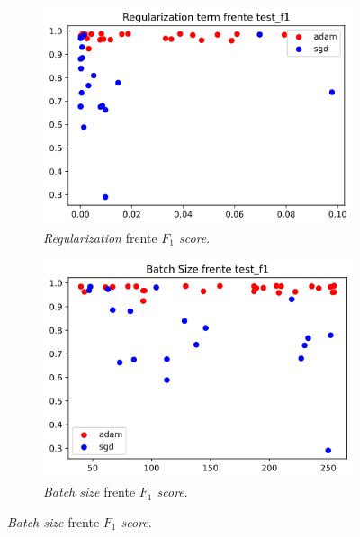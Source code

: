 \begin{figure}[H]
\begin{subfigure}{.5\textwidth}
  \centering
  \includegraphics[width=.8\linewidth]{imagenes/06_Experimentacion/caeimages/caereg.png}
  \caption{\textit{Regularization} frente \textit{$F_1$ score}.}
  \label{fig:caeoreg}
\end{subfigure}
\begin{subfigure}{.5\textwidth}
  \centering
  \includegraphics[width=.8\linewidth]{imagenes/06_Experimentacion/caeimages/caebs.png}  
  \caption{\textit{Batch size} frente \textit{$F_1$ score}.}
  \label{fig:caebr}
\end{subfigure}

\newline


\end{figure}
